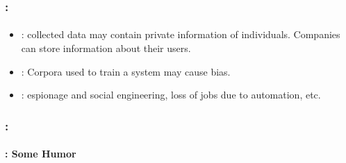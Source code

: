 \documentclass[xcolor=table]{beamer}
\begin{document}
\begin{frame}
	\frametitle{\insertshortsubtitle: \insertsection}
	\framesubtitle{\insertsubsection}

	\begin{itemize}
		\item {}: collected data may contain private information of individuals. Companies can store information about their users.
		\item {}: Corpora used to train a system may cause bias.
		\item {}: espionage and social engineering, loss of jobs due to automation, etc.
	\end{itemize}

\end{frame}

\begin{frame}
	\frametitle{\insertshortsubtitle: \insertsection}
	\framesubtitle{\insertsubsection: Some Humor}

	\begin{center}
	\end{center}

\end{frame}

\end{document}

